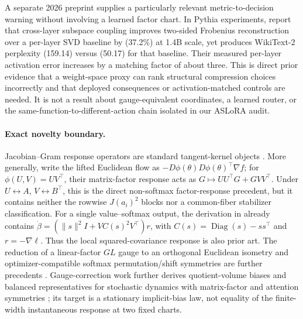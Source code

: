 A separate 2026 preprint supplies a particularly relevant metric-to-decision
warning without involving a learned factor chart.  In Pythia experiments,
\citet{khilar2026crosslayer} report that cross-layer subspace coupling improves
two-sided Frobenius reconstruction over a per-layer SVD baseline by (37.2\%)
at 1.4B scale, yet produces WikiText-2 perplexity (159.14) versus (50.17)
for that baseline.  Their measured per-layer activation error increases by a
matching factor of about three.  This is direct prior evidence that a
weight-space proxy can rank structural compression choices incorrectly and
that deployed consequences or activation-matched controls are needed.  It is
not a result about gauge-equivalent coordinates, a learned router, or the
same-function-to-different-action chain isolated in our ASLoRA audit.

\paragraph{Exact novelty boundary.}
Jacobian--Gram response operators are standard tangent-kernel objects
\citep{jacot2018neural}.  More generally, \citet{marcotte2026intrinsic} write
the lifted Euclidean flow as
$-D\phi(\theta)D\phi(\theta)^\top\nabla f$; for
$\phi(U,V)=UV^\top$, their matrix-factor response acts as
$G\mapsto UU^\top G+GVV^\top$.  Under
$U\leftrightarrow A$, $V\leftrightarrow B^\top$, this is the direct
non-softmax factor-response precedent, but it contains neither the rowwise
$J(a_i)^2$ blocks nor a common-fiber stabilizer classification.
For a single value--softmax output, the derivation in
\citet[Lemma~D.2]{varre2026gradient} already contains
$\dot\beta=(\|s\|^2I+VC(s)^2V^\top)r$, with
$C(s)=\operatorname{Diag}(s)-ss^\top$ and $r=-\nabla\ell$.
Thus the local squared-covariance response is also prior art.
The reduction of a linear-factor $GL$ gauge to an orthogonal Euclidean
isometry and optimizer-compatible softmax permutation/shift symmetries
are further precedents \citep{singh2026loss,lau2026symmetry}.
Gauge-correction work further derives quotient-volume biases and balanced
representatives for stochastic dynamics with matrix-factor and attention
symmetries \citep{aladrah2026implicit}; its target is a stationary
implicit-bias law, not equality of the finite-width instantaneous response at
two fixed charts.

